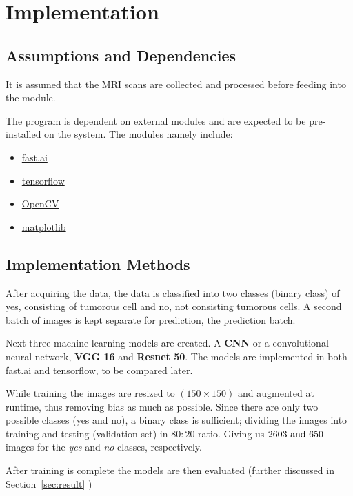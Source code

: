 \documentclass[11pt]{article}
\begin{document}
	\section[implementation]{Implementation}

	\subsection{Assumptions and Dependencies}%
	\label{sub:Assumptions and Dependencies}
	It is assumed that the MRI scans are collected and processed before feeding
	into the module.

	The program is dependent on external modules and are expected to be
	pre-installed on the system. The modules namely include:

	\begin{itemize}
		\item \href{https://www.fast.ai/}{fast.ai}
		\item \href{https://www.tensorflow.org/}{tensorflow}
		\item \href{https://opencv.org/}{OpenCV}
		\item \href{https://matplotlib.org/}{matplotlib}
	\end{itemize}

	\subsection{Implementation Methods}%
	\label{sub:Implementation Methods}
	After acquiring the data, the data is classified into two classes (binary
	class) of yes, consisting of tumorous cell and no, not consisting tumorous
	cells. A second batch of images is kept separate for prediction, the
	prediction batch.

	Next three machine learning models are created. A \textbf{CNN} or a
	convolutional neural network, \textbf{VGG 16} and \textbf{Resnet 50}. The
	models are implemented in both fast.ai and tensorflow, to be compared later.

	While training the images are resized to $(150 \times 150)$ and augmented at
	runtime, thus removing bias as much as possible. Since there are only two
	possible classes (yes and no), a binary class is sufficient; dividing the
	images into training and testing (validation set) in $80:20$ ratio. Giving
	us $2603 \ \textnormal{and} \ 650$ images for the \textit{yes} and
	\textit{no} classes, respectively.

	After training is complete the models are then evaluated (further discussed
	in Section~\ref{sec:result} )
\end{document}

